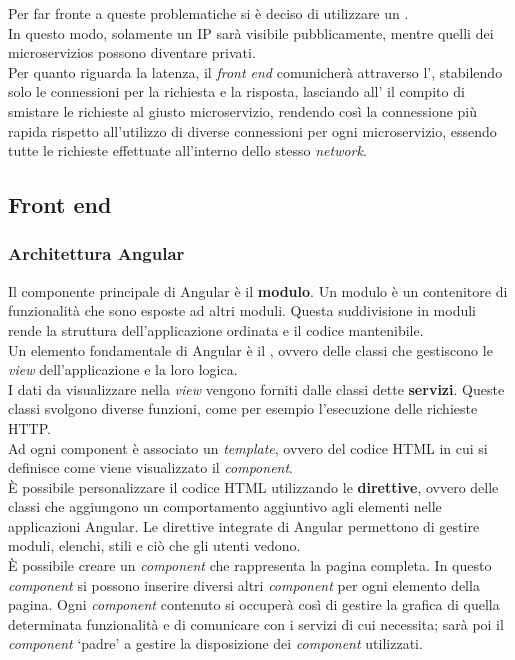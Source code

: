 \noindent Per far fronte a queste problematiche si è deciso di utilizzare un
.\\
In questo modo, solamente un \gls{IP} sarà visibile pubblicamente, mentre
quelli dei \glspl{microservizio} possono diventare privati.\\
Per quanto riguarda la latenza, il \textit{front end} comunicherà attraverso
l', stabilendo solo le connessioni per la richiesta e
la risposta, lasciando all' il compito di smistare le
richieste al giusto \gls{microservizio}, rendendo così la connessione più
rapida rispetto all'utilizzo di diverse connessioni per ogni
\gls{microservizio}, essendo tutte le richieste effettuate all'interno dello
stesso \textit{network}.

\subsection{Front end}
\subsubsection{Architettura Angular}
Il componente principale di Angular è il \textbf{modulo}. Un modulo è un
contenitore di funzionalità che sono esposte ad altri moduli. Questa
suddivisione in moduli rende la struttura dell'applicazione ordinata e il
codice mantenibile.\\
Un elemento fondamentale di Angular è il , ovvero delle classi
che gestiscono le \textit{view} dell'applicazione e la loro logica.\\
I dati da visualizzare nella \textit{view} vengono forniti dalle classi dette
\textbf{servizi}. Queste classi svolgono diverse funzioni, come per esempio
l'esecuzione delle richieste HTTP.\\
Ad ogni component è associato un \textit{template}, ovvero del codice HTML in
cui si definisce come viene visualizzato il \textit{component}.\\
È possibile personalizzare il codice HTML utilizzando le \textbf{direttive},
ovvero delle classi che aggiungono un comportamento aggiuntivo agli elementi
nelle applicazioni Angular. Le direttive integrate di Angular permettono di
gestire moduli, elenchi, stili e ciò che gli utenti vedono.\\
È possibile creare un \textit{component} che rappresenta la pagina completa. In
questo \textit{component} si possono inserire diversi altri \textit{component}
per ogni elemento della pagina.
Ogni \textit{component} contenuto si occuperà così di gestire la grafica di
quella determinata funzionalità e di comunicare con i servizi di cui necessita;
sarà poi il \textit{component} \enquote*{padre} a gestire la disposizione dei
\textit{component} utilizzati. \cite{site-angular-concepts}

